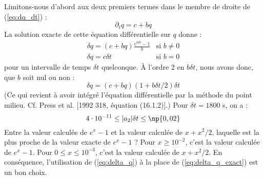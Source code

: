 \documentclass[a4paper,english,french]{article}
\begin{document}
Limitons-nous d'abord aux deux premiers termes dans le membre de
droite de (\ref{eq:dq_dt}) :
\begin{equation}
  \label{eq:dq_dt_c_a2}
  \partial_t q = c + b q
\end{equation}
La solution exacte de cette équation différentielle sur $q$ donne :
\begin{equation}
  \label{eq:delta_q_exact}
  \begin{array}{|ll}
    \delta q = (c + b q) \frac{e^{b \delta t} - 1}{b}
    & \textrm{si } b \ne 0 \\
    \delta q = c \delta t & \textrm{si } b = 0
  \end{array}
\end{equation}
pour un intervalle de temps $\delta t$ quelconque. \`A l'ordre 2 en
$b \delta t$, nous avons donc, que $b$ soit nul ou non :
\begin{equation}
  \label{eq:delta_q}
  \delta q = (c + b q) (1 + b \delta t / 2) \delta t
\end{equation}
(Ce qui revient à avoir intégré l'équation différentielle par la
méthode du point milieu. Cf. Press et al. [1992 318, équation
(16.1.2)].) Pour $\delta t = 1800$ s, on a :
\begin{displaymath}
  4 \cdot 10^{-11} \le |a_2| \delta t \le \np{0,02}
\end{displaymath}
Entre la valeur calculée de $e^x -1$ et la valeur calculée de $x + x^2
/ 2$, laquelle est la plus proche de la valeur exacte de $e^x -1$ ?
Pour $x \ge 10^{-2}$, c'est la valeur calculée de $e^x -1$. Pour $0
\le x \le 10^{-3}$, c'est la valeur calculée de $x + x^2 / 2$. En
conséquence, l'utilisation de (\ref{eq:delta_q}) à la place de
(\ref{eq:delta_q_exact}) est un bon choix.
\end{document}
